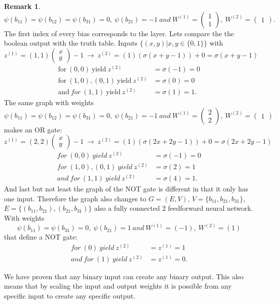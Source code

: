 \documentclass{article}
\theoremstyle{definition}
\newtheorem{remark}[theorem]{Remark}
\begin{document}
\begin{remark}
$$\psi(b_{11})=\psi(b_{12})=\psi(b_{31})=0, \ \psi(b_{21})=-1 \ and \ W^{(1)}=\begin{pmatrix}1\\1\end{pmatrix}, \ W^{(2)}=\begin{pmatrix}1\end{pmatrix}.$$
The first index of every bias corresponds to the layer. Lets compare the the boolean output with the truth table. Inputs $\{(x, y)|x, y \in \{0, 1\}\}$ with
$$z^{(1)}=(1, 1)\begin{pmatrix}x\\y\end{pmatrix}-1 \ \to \ z^{(2)} = (1)(\sigma(x+y-1))+0 = \sigma(x+y-1)$$
\begin{align*}
\text{for} \ (0, 0) \ \text{yield} \ z^{(2)}&=\sigma(-1)=0 \\
\text{for} \ (1, 0), (0, 1) \ \text{yield} \ z^{(2)}&=\sigma(0)=0 \\
\text{and} \ for \ (1, 1) \ \text{yield} \ z^{(2)}&=\sigma(1)=1.
\end{align*}
The same graph with weights
$$\psi(b_{11})=\psi(b_{12})=\psi(b_{31})=0, \ \psi(b_{21})=-1 \ and \ W^{(1)}=\begin{pmatrix}2\\2\end{pmatrix}, \ W^{(2)}=\begin{pmatrix}1\end{pmatrix}$$
makes an OR gate:
$$z^{(1)}=(2, 2)\begin{pmatrix}x\\y\end{pmatrix}-1 \ \to \ z^{(2)} = (1)(\sigma(2x+2y-1))+0 = \sigma(2x+2y-1)$$
\begin{align*}
for \ (0, 0) \ yield \ z^{(2)}&=\sigma(-1)=0 \\
for \ (1, 0), (0, 1) \ yield \ z^{(2)}&=\sigma(2)=1 \\
and \ for \ (1, 1) \ yield \ z^{(2)}&=\sigma(4)=1.
\end{align*}
And last but not least the graph of the NOT gate is different in that it only has one input. Therefore the graph also changes to $G=(E, V)$, $V=\{ b_{11}, b_{21}, b_{31} \}$, $E=\{ (b_{11}, b_{21}), (b_{21}, b_{31})\}$ also a fully connected $2$ feedforward neural network. With weights
$$\psi(b_{11})=\psi(b_{31})=0, \ \psi(b_{21})=1 \ and \ W^{(1)}=(-1), \ W^{(2)}=(1)$$
that define a NOT gate:
\begin{align*}
for \ (0) \ yield \ z^{(2)}&= z^{(1)} = 1 \\
and \ for \ (1) \ yield \ z^{(2)}&= z^{(1)} = 0.
\end{align*}

We have proven that any binary input can create any binary output. This also means that by scaling the input and output weights it is possible from any specific input to create any specific output.

\end{remark}
\end{document}

